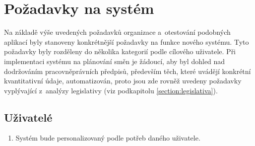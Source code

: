 \documentclass[twoside]{ctuthesis}
\begin{document}
%

\section{Požadavky na systém}
Na základě výše uvedených požadavků organizace a~otestování podobných aplikací byly stanoveny konkrétnější požadavky na funkce nového systému. Tyto požadavky byly rozděleny do několika kategorií podle cílového uživatele. Při implementaci systému na plánování směn je žádoucí, aby byl dohled nad dodržováním pracovněprávních předpisů, především těch, které uvádějí konkrétní kvantitativní údaje, automatizován, proto jsou zde rovněž uvedeny požadavky vyplývající z~analýzy legislativy (viz podkapitolu \ref{section:legislativa}).

\subsection{Uživatelé}
\begin{enumerate}[label=\textbf{U\arabic*.}]
		\item Systém bude personalizovaný podle potřeb daného uživatele.
\end{enumerate}
\end{document}
